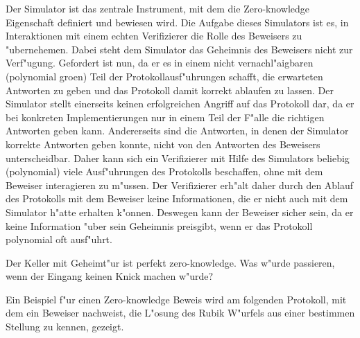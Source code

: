 Der Simulator ist das zentrale Instrument, mit dem die Zero-knowledge
Eigenschaft definiert und bewiesen wird. Die Aufgabe dieses Simulators
ist es, in Interaktionen mit einem echten Verifizierer die Rolle
des Beweisers zu "ubernehemen. Dabei steht dem Simulator das Geheimnis
des Beweisers nicht zur Verf"ugung. Gefordert ist nun, da\3 er es in
einem nicht vernachl"a\3igbaren (polynomial gro\3en) Teil der
Protokollausf"uhrungen schafft, die erwarteten Antworten zu geben und
das Protokoll damit korrekt ablaufen zu lassen. Der Simulator stellt
einerseits keinen erfolgreichen Angriff auf das Protokoll dar, da er
bei konkreten Implementierungen nur in einem Teil der F"alle die
richtigen Antworten geben kann. Andererseits sind die Antworten, in
denen der Simulator korrekte Antworten geben konnte, nicht von den
Antworten des Beweisers unterscheidbar. Daher kann sich ein
Verifizierer mit Hilfe des Simulators beliebig (polynomial) viele
Ausf"uhrungen des Protokolls beschaffen, ohne mit dem Beweiser
interagieren zu m"ussen. Der Verifizierer erh"alt daher durch den
Ablauf des Protokolls mit dem Beweiser keine Informationen, die er
nicht auch mit dem Simulator h"atte erhalten k"onnen. Deswegen kann
der Beweiser sicher sein, da\3 er keine Information "uber sein
Geheimnis preisgibt, wenn er das Protokoll polynomial oft ausf"uhrt.

\begin{beispiel}
Der Keller mit Geheimt"ur ist perfekt zero-knowledge. Was w"urde
passieren, wenn der Eingang keinen Knick machen w"urde?
\end{beispiel}

Ein Beispiel f"ur einen Zero-knowledge Beweis wird am folgenden
Protokoll, mit dem ein Beweiser nachweist, die L"osung des
Rubik W"urfels aus einer bestimmen Stellung zu kennen, gezeigt.

